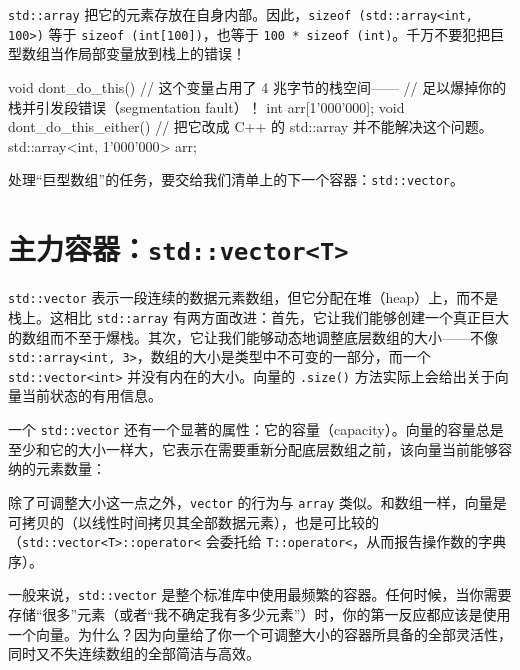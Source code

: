 \texttt{std::\allowbreak{}array} 把它的元素存放在自身内部。因此，\texttt{sizeof (\allowbreak{}std::\allowbreak{}array<\allowbreak{}int,\allowbreak{} 100>\allowbreak{})\allowbreak{}} 等于 \texttt{sizeof (\allowbreak{}int[100])\allowbreak{}}，也等于 \texttt{100 * sizeof (\allowbreak{}int)\allowbreak{}}。千万不要犯把巨型数组当作局部变量放到栈上的错误！

\begin{codebox}[cpp]
    void dont_do_this()
    {
      // 这个变量占用了 4 兆字节的栈空间——
      // 足以爆掉你的栈并引发段错误（segmentation fault）！
      int arr[1'000'000];
    }
    void dont_do_this_either()
    {
      // 把它改成 C++ 的 std::array 并不能解决这个问题。
      std::array<int, 1'000'000> arr;
    }
\end{codebox}

处理“巨型数组”的任务，要交给我们清单上的下一个容器：\texttt{std::\allowbreak{}vector}。

\section{主力容器：\texttt{std::\allowbreak{}vector<\allowbreak{}T>\allowbreak{}}}

\texttt{std::\allowbreak{}vector} 表示一段连续的数据元素数组，但它分配在堆（heap）上，而不是栈上。这相比 \texttt{std::\allowbreak{}array} 有两方面改进：首先，它让我们能够创建一个真正巨大的数组而不至于爆栈。其次，它让我们能够动态地调整底层数组的大小——不像 \texttt{std::\allowbreak{}array<\allowbreak{}int,\allowbreak{} 3>\allowbreak{}}，数组的大小是类型中不可变的一部分，而一个 \texttt{std::\allowbreak{}vector<\allowbreak{}int>\allowbreak{}} 并没有内在的大小。向量的 \texttt{.size(\allowbreak{})\allowbreak{}} 方法实际上会给出关于向量当前状态的有用信息。

一个 \texttt{std::\allowbreak{}vector} 还有一个显著的属性：它的容量（capacity）。向量的容量总是至少和它的大小一样大，它表示在需要重新分配底层数组之前，该向量当前能够容纳的元素数量：


除了可调整大小这一点之外，\texttt{vector} 的行为与 \texttt{array} 类似。和数组一样，向量是可拷贝的（以线性时间拷贝其全部数据元素），也是可比较的（\texttt{std::\allowbreak{}vector<\allowbreak{}T>\allowbreak{}::\allowbreak{}operator<} 会委托给 \texttt{T::\allowbreak{}operator<}，从而报告操作数的字典序）。

一般来说，\texttt{std::\allowbreak{}vector} 是整个标准库中使用最频繁的容器。任何时候，当你需要存储“很多”元素（或者“我不确定我有多少元素”）时，你的第一反应都应该是使用一个向量。为什么？因为向量给了你一个可调整大小的容器所具备的全部灵活性，同时又不失连续数组的全部简洁与高效。

